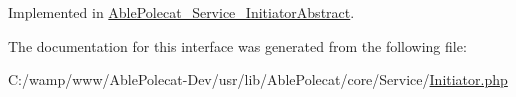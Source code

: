 Implemented in \hyperlink{class_able_polecat___service___initiator_abstract_a66e49cc03d1511ec4c0290ffaa688079}{Able\+Polecat\+\_\+\+Service\+\_\+\+Initiator\+Abstract}.



The documentation for this interface was generated from the following file\+:\begin{DoxyCompactItemize}
\item 
C\+:/wamp/www/\+Able\+Polecat-\/\+Dev/usr/lib/\+Able\+Polecat/core/\+Service/\hyperlink{_initiator_8php}{Initiator.\+php}\end{DoxyCompactItemize}
